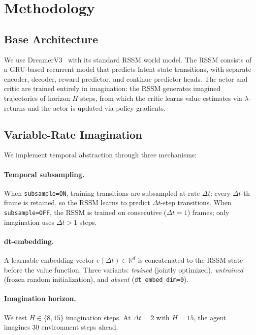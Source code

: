 \documentclass[10pt,letterpaper]{article}
\newcommand{\dt}{\Delta t}
\begin{document}
\section{Methodology}\label{sec:method}

\subsection{Base Architecture}

We use DreamerV3~\citep{hafner2023dreamerv3} with its standard RSSM world model.
The RSSM consists of a GRU-based recurrent model that predicts latent state transitions, with separate encoder, decoder, reward predictor, and continue predictor heads.
The actor and critic are trained entirely in imagination: the RSSM generates imagined trajectories of horizon $H$ steps, from which the critic learns value estimates via $\lambda$-returns and the actor is updated via policy gradients.

\subsection{Variable-Rate Imagination}

We implement temporal abstraction through three mechanisms:

\paragraph{Temporal subsampling.}
When \texttt{subsample=ON}, training transitions are subsampled at rate $\dt$: every $\dt$-th frame is retained, so the RSSM learns to predict $\dt$-step transitions.
When \texttt{subsample=OFF}, the RSSM is trained on consecutive ($\dt=1$) frames; only imagination uses $\dt>1$ steps.

\paragraph{dt-embedding.}
A learnable embedding vector $e(\dt) \in \mathbb{R}^d$ is concatenated to the RSSM state before the value function.
Three variants: \emph{trained} (jointly optimized), \emph{untrained} (frozen random initialization), and \emph{absent} (\texttt{dt\_embed\_dim=0}).

\paragraph{Imagination horizon.}
We test $H \in \{8, 15\}$ imagination steps.
At $\dt=2$ with $H=15$, the agent imagines 30 environment steps ahead.
\end{document}
